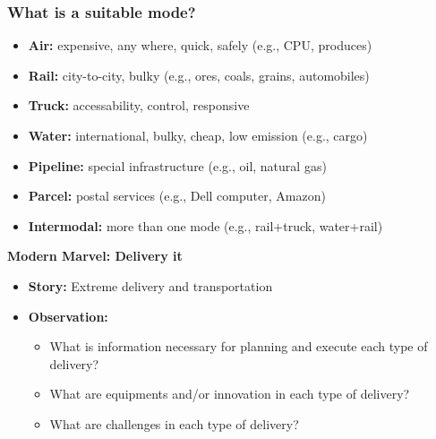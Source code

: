 \documentclass[10pt,presentation]{beamer}
\begin{document}
\begin{frame}
  \frametitle{What is a suitable mode?}

  \begin{itemize}
    \item \textbf{Air:} expensive, any where, quick, safely (e.g., CPU, produces)
    \item \textbf{Rail:} \alert{city-to-city}, bulky (e.g., ores, coals, grains, automobiles)
    \item \textbf{Truck:} accessability, \alert{control}, \alert{responsive}
    \item \textbf{Water:} international, bulky, cheap, \alert{low emission} (e.g., cargo)
    \item \textbf{Pipeline:} special infrastructure (e.g., oil, natural gas)
    \item \textbf{Parcel:} postal services (e.g., Dell computer, Amazon)
    \item \textbf{Intermodal:} more than one mode (e.g., rail+truck, water+rail)
  \end{itemize}

  \NextLine
  \textbf{Modern Marvel: Delivery it}
  \begin{itemize}
    \item \textbf{Story:} Extreme delivery and transportation
    \item \textbf{Observation:}
    \begin{itemize}
      \item What is information necessary for planning and execute each type of delivery?
      \item What are equipments and/or innovation in each type of delivery?
      \item What are challenges in each type of delivery?
    \end{itemize}
  \end{itemize}


  \end{frame}
\end{document}
